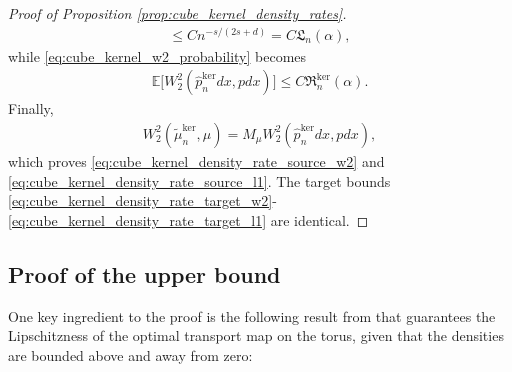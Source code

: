\documentclass[11pt,reqno]{amsart}
\theoremstyle{definition}
\renewcommand{\hat}{\widehat}
\renewcommand{\tilde}{\widetilde}
\newcommand{\Ep}{\mathbb{E}}
\begin{document}
\begin{proof}[Proof of Proposition \ref{prop:cube_kernel_density_rates}]
\begin{align*}
    \le
    C n^{{-s/(2s+d)}}
    =
    C\mathfrak L_n(\alpha),
\end{align*}
while \eqref{eq:cube_kernel_w2_probability} becomes
\begin{align*}
    \Ep\bigl[W_2^2(\hat p_n^{\mathrm{ker}}dx,p dx)\bigr]
    \le
    C\mathfrak R_n^{\mathrm{ker}}(\alpha).
\end{align*}
Finally,
\begin{align*}
    W_2^2(\tilde\mu_n^{\mathrm{ker}},\mu)
    =
    M_\mu W_2^2(\hat p_n^{\mathrm{ker}}dx,p dx),
\end{align*}
which proves \eqref{eq:cube_kernel_density_rate_source_w2} and \eqref{eq:cube_kernel_density_rate_source_l1}.
The target bounds \eqref{eq:cube_kernel_density_rate_target_w2}-\eqref{eq:cube_kernel_density_rate_target_l1} are identical.
\end{proof}


\subsection{Proof of the upper bound}



One key ingredient to the proof is the following result from \cite{Cordero1999} that guarantees the Lipschitzness of the optimal transport map on the torus, given that the densities are bounded above and away from zero:
\end{document}
